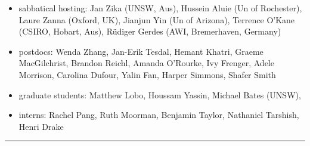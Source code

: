 \documentclass{article}
\begin{document}
\begin{itemize}[leftmargin=*]

\item {\sc sabbatical hosting}: Jan Zika (UNSW, Aus), Hussein Aluie (Un of Rochester), Laure Zanna (Oxford, UK), Jianjun Yin (Un of Arizona), Terrence O'Kane (CSIRO, Hobart, Aus), {R\"{u}diger} Gerdes (AWI, Bremerhaven, Germany)

\item {\sc postdocs}: Wenda Zhang, Jan-Erik Tesdal, Hemant Khatri, Graeme MacGilchrist, Brandon Reichl, Amanda O'Rourke, Ivy Frenger, Adele Morrison, Carolina Dufour, Yalin Fan, Harper Simmons, Shafer Smith

\item {\sc graduate students}: Matthew Lobo, Houssam Yassin, Michael Bates (UNSW), 

\item {\sc interns}: Rachel Pang, Ruth Moorman, Benjamin Taylor, Nathaniel Tarshish, Henri Drake 

\end{itemize}

\vspace{-.5cm}
\noindent\rule{\textwidth}{1pt}


\end{document}
